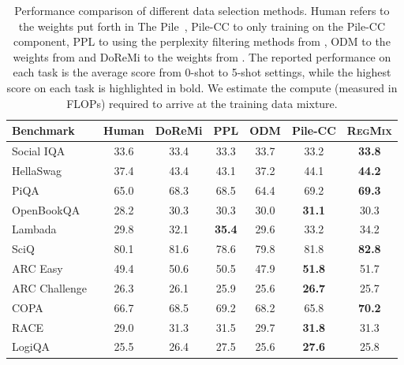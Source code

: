 \documentclass{article}
\theoremstyle{definition}
\theoremstyle{remark}
\newcommand{\ourmethod}{\textsc{RegMix}\xspace}
\begin{document}
\begin{table}[tb]
    \centering
    \small
    \caption{Performance comparison of different data selection methods. Human refers to the weights put forth in The Pile~\citep{the_pile_corpus}, Pile-CC to only training on the Pile-CC component, PPL to using the perplexity filtering methods from \citet{zachary2024perplexed}, ODM to the weights from \citet{albalak2023efficient} and DoReMi to the weights from \citet{xie2023doremi}. The reported performance on each task is the average score from 0-shot to 5-shot settings, while the highest score on each task is highlighted in bold. We estimate the compute (measured in FLOPs) required to arrive at the training data mixture.}
    \label{tab:downstream_perf_our}
    \vspace{1mm}
    \begin{tabular}{l|cccccc}
    \toprule
         \textbf{Benchmark} & \textbf{Human} & \textbf{DoReMi} & \textbf{PPL} & \textbf{ODM} & \textbf{Pile-CC} & \textbf{\ourmethod} \\
    \midrule
        Social IQA~\citep{sap2019socialiqa} & 33.6 & 33.4 & 33.3 & 33.7 & 33.2 & \textbf{33.8}  \\ 
        HellaSwag~\citep{zellers2019hellaswag} & 37.4 & 43.4 & 43.1 & 37.2 & 44.1 & \textbf{44.2}  \\ 
        PiQA~\citep{bisk2020piqa} & 65.0 & 68.3 & 68.5 & 64.4 & 69.2 & \textbf{69.3}  \\ 
        OpenBookQA~\citep{mihaylov2018can} & 28.2 & 30.3 & 30.3 & 30.0 & \textbf{31.1} & 30.3  \\ 
        Lambada~\citep{paperno2016lambada} & 29.8 & 32.1 & \textbf{35.4} & 29.6 & 33.2 & {34.2}  \\
        SciQ~\citep{welbl2017crowdsourcing} & 80.1 & 81.6 & 78.6 & 79.8 & 81.8 & \textbf{82.8}  \\ 
        ARC Easy~\citep{clark2018think} & 49.4 & 50.6 & 50.5 & 47.9 & \textbf{51.8} & 51.7  \\ 
        ARC Challenge~\citep{clark2018think} & 26.3 & 26.1 & 25.9 & 25.6 & \textbf{26.7} & 25.7  \\ 
        COPA~\citep{sarlin2020superglue} & 66.7 & 68.5 & 69.2 & 68.2 & 65.8 & \textbf{70.2}  \\ 
        RACE~\citep{lai2017race} & 29.0 & 31.3 & 31.5 & 29.7 & \textbf{31.8} & 31.3 \\ 
        LogiQA~\citep{liu2020logiqa} & 25.5 & {26.4} &  27.5 & 25.6 & \textbf{27.6} & 25.8  \\ 

\end{tabular}
\end{table}
\end{document}
